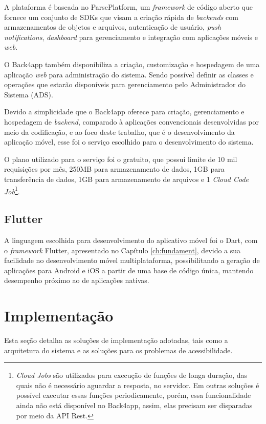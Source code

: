 A plataforma é baseada no ParsePlatform, um \emph{framework} de código aberto que fornece um conjunto de SDKs que visam a criação rápida de \emph{backends}
com armazenamentos de objetos e arquivos, autenticação de usuário, \emph{push notifications}, \emph{dashboard} para gerenciamento e integração com aplicações móveis e \emph{web}.

O Back4app também disponibiliza a criação, customização e hospedagem de uma aplicação \emph{web} para administração do sistema.
Sendo possível definir as classes e operações que estarão disponíveis para gerenciamento pelo Administrador do Sistema (ADS).

Devido a simplicidade que o Back4app oferece para criação, gerenciamento e hospedagem de \emph{backend}, comparado
à aplicações convencionais desenvolvidas por meio da codificação, e ao foco deste trabalho, que é o
desenvolvimento da aplicação móvel, esse foi o serviço escolhido para o desenvolvimento do sistema.

O plano utilizado para o serviço foi o gratuito, que possui limite de 10 mil requisições por mês, 250MB para armazenamento de dados,
1GB para transferência de dados, 1GB para armazenamento de arquivos e 1 \emph{Cloud Code Job}\footnote{\emph{Cloud Jobs} são utilizados
    para execução de funções de longa duração, das quais não é necessário aguardar a resposta, no servidor. Em outras soluções é possível
    executar essas funções periodicamente, porém, essa funcionalidade ainda não está disponível no Back4app, assim, elas precisam ser disparadas
    por meio da API Rest.}.

\subsection{Flutter}

A linguagem escolhida para desenvolvimento do aplicativo móvel foi o Dart, com o \emph{framework} Flutter, apresentado
no Capítulo \ref{ch:fundament}, devido a sua facilidade no desenvolvimento móvel multiplataforma, possibilitando a geração
de aplicações para Android e iOS a partir de uma base de código única, mantendo desempenho próximo ao de aplicações nativas.

\section{Implementação}

Esta seção detalha as soluções de implementação adotadas, tais como a arquitetura do sistema e as soluções
para os problemas de acessibilidade.


